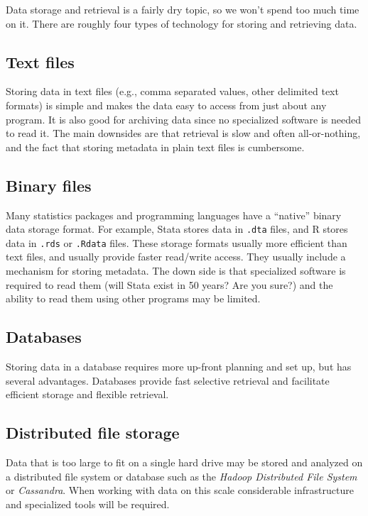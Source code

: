 \documentclass[]{book}
\begin{document}
Data storage and retrieval is a fairly dry topic, so we won't spend too
much time on it. There are roughly four types of technology for storing
and retrieving data.

\subsection{Text files}\label{text-files}

Storing data in text files (e.g., comma separated values, other
delimited text formats) is simple and makes the data easy to access from
just about any program. It is also good for archiving data since no
specialized software is needed to read it. The main downsides are that
retrieval is slow and often all-or-nothing, and the fact that storing
metadata in plain text files is cumbersome.

\subsection{Binary files}\label{binary-files}

Many statistics packages and programming languages have a ``native''
binary data storage format. For example, Stata stores data in
\texttt{.dta} files, and R stores data in \texttt{.rds} or
\texttt{.Rdata} files. These storage formats usually more efficient than
text files, and usually provide faster read/write access. They usually
include a mechanism for storing metadata. The down side is that
specialized software is required to read them (will Stata exist in 50
years? Are you sure?) and the ability to read them using other programs
may be limited.

\subsection{Databases}\label{databases}

Storing data in a database requires more up-front planning and set up,
but has several advantages. Databases provide fast selective retrieval
and facilitate efficient storage and flexible retrieval.

\subsection{Distributed file storage}\label{distributed-file-storage}

Data that is too large to fit on a single hard drive may be stored and
analyzed on a distributed file system or database such as the
\emph{Hadoop Distributed File System} or \emph{Cassandra}. When working
with data on this scale considerable infrastructure and specialized
tools will be required.
\end{document}
